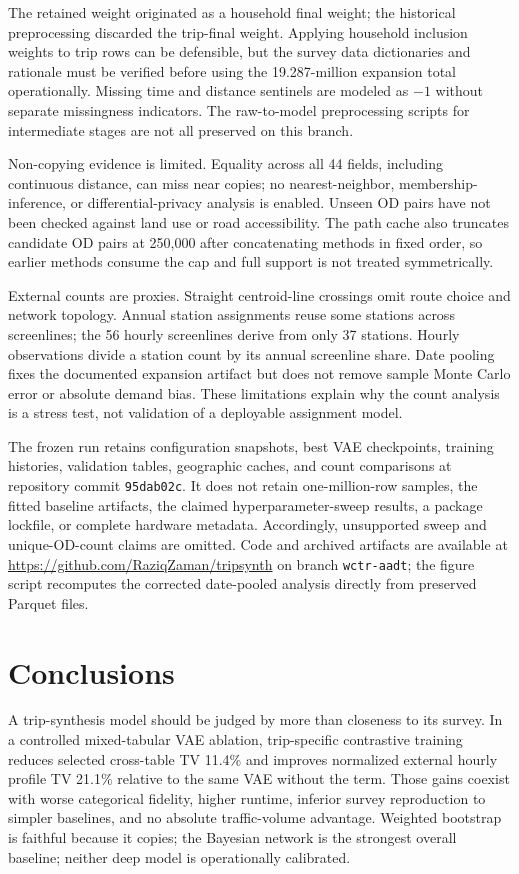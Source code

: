 \documentclass[numbered]{trbunofficial}
\begin{document}
The retained weight originated as a household final weight; the historical preprocessing discarded the trip-final weight. Applying household inclusion weights to trip rows can be defensible, but the survey data dictionaries and rationale must be verified before using the 19.287-million expansion total operationally. Missing time and distance sentinels are modeled as $-1$ without separate missingness indicators. The raw-to-model preprocessing scripts for intermediate stages are not all preserved on this branch.

Non-copying evidence is limited. Equality across all 44 fields, including continuous distance, can miss near copies; no nearest-neighbor, membership-inference, or differential-privacy analysis is enabled. Unseen OD pairs have not been checked against land use or road accessibility. The path cache also truncates candidate OD pairs at 250,000 after concatenating methods in fixed order, so earlier methods consume the cap and full support is not treated symmetrically.

External counts are proxies. Straight centroid-line crossings omit route choice and network topology. Annual station assignments reuse some stations across screenlines; the 56 hourly screenlines derive from only 37 stations. Hourly observations divide a station count by its annual screenline share. Date pooling fixes the documented expansion artifact but does not remove sample Monte Carlo error or absolute demand bias. These limitations explain why the count analysis is a stress test, not validation of a deployable assignment model.

The frozen run retains configuration snapshots, best VAE checkpoints, training histories, validation tables, geographic caches, and count comparisons at repository commit \texttt{95dab02c}. It does not retain one-million-row samples, the fitted baseline artifacts, the claimed hyperparameter-sweep results, a package lockfile, or complete hardware metadata. Accordingly, unsupported sweep and unique-OD-count claims are omitted. Code and archived artifacts are available at \url{https://github.com/RaziqZaman/tripsynth} on branch \texttt{wctr-aadt}; the figure script recomputes the corrected date-pooled analysis directly from preserved Parquet files.

\section{Conclusions}

A trip-synthesis model should be judged by more than closeness to its survey. In a controlled mixed-tabular VAE ablation, trip-specific contrastive training reduces selected cross-table TV 11.4\% and improves normalized external hourly profile TV 21.1\% relative to the same VAE without the term. Those gains coexist with worse categorical fidelity, higher runtime, inferior survey reproduction to simpler baselines, and no absolute traffic-volume advantage. Weighted bootstrap is faithful because it copies; the Bayesian network is the strongest overall baseline; neither deep model is operationally calibrated.
\end{document}
